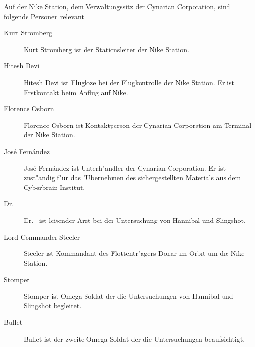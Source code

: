 
Auf der Nike Station, dem Verwaltungssitz der Cynarian Corporation, sind folgende Personen relevant:

\begin{description}
    \item [Kurt Stromberg] Kurt Stromberg ist der Stationsleiter der Nike Station.
    \item [Hitesh Devi] Hitesh Devi ist Flugloze bei der Flugkontrolle der Nike Station. Er ist Erstkontakt beim Anflug auf Nike.
    \item [Florence Osborn] Florence Osborn ist Kontaktperson der Cynarian Corporation am Terminal der Nike Station.
    \item [Jos\'e Fern\'andez] Jos\'e Fern\'andez ist Unterh"andler der Cynarian Corporation. Er ist zust"andig f"ur das "Ubernehmen des 
        sichergestellten Materials aus dem Cyberbrain Institut.
    \item [Dr.~ ] Dr.~  ist leitender Arzt bei der Untersuchung von Hannibal und 
        Slingshot.
    \item [Lord Commander Steeler] Steeler ist Kommandant des Flottentr"agers Donar im Orbit um die Nike Station.
    \item [Stomper] Stomper ist Omega-Soldat der die Untersuchungen von Hannibal und Slingshot begleitet.
    \item [Bullet] Bullet ist der zweite Omega-Soldat der die Untersuchungen beaufsichtigt.
\end{description}


